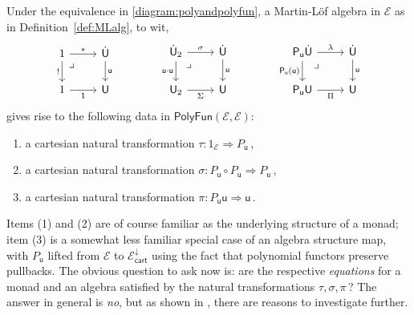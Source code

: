 \documentclass[12pt,reqno]{amsart}
\newcommand{\EE}{\ensuremath{\mathcal{E}}}
\newcommand{\alg}[1]{\ensuremath{\mathsf{#1}}}
\renewcommand{\t}{\ensuremath{\mathsf{u}}}
\newcommand{\T}{\ensuremath{\mathsf{U}}}
\newcommand{\TT}{\ensuremath{\dot{\mathsf{U}}}}
\newcommand{\pbcorner}{\arrow[dr,phantom,"\lrcorner" very near start, shift right=.5ex]} %
\theoremstyle{remark}
\theoremstyle{definition}
\begin{document}
Under the equivalence in \eqref{diagram:polyandpolyfun}, a Martin-L\"of algebra in $\EE$ as in Definition~\ref{def:MLalg}, to wit,
\begin{equation}\label{diag:MLalg2}
\begin{tikzcd}
	1 \ar[r,"*"] \ar[d,swap,"!"] \pbcorner &  \TT \ar[d, "\t"]\\  
	1 \ar[r, swap,"\mathsf{1}"] & \T
 \end{tikzcd}\qquad \qquad 
 \begin{tikzcd}
	\TT_2  \ar[r,"\sigma"] \ar[d,swap,"\t\cdot\t"] \pbcorner &  \TT \ar[d, "\t"]\\  
	\T_2 \ar[r,swap, "\Sigma"] & \T
\end{tikzcd} \qquad \qquad 
	 \begin{tikzcd}
	\alg{P}_\t\TT \ar[r,"\lambda"] \ar[d,swap,"\alg{P}_\t(\t)"] \pbcorner &  \TT \ar[d, "\t"]\\  
	\alg{P}_\t\T \ar[r,swap, "\Pi"] & \T
 \end{tikzcd} 
 \end{equation}
gives rise to the following data in $\mathsf{PolyFun}(\EE, \EE)$:
\begin{enumerate}
\item a cartesian natural transformation $\tau :1_\EE \Rightarrow P_\t$\,,
\item a cartesian natural transformation $\sigma :P_\t\circ P_\t \Rightarrow P_\t$\,,
\item a cartesian natural transformation $\pi:P_\t\t \Rightarrow \t$\,.
\end{enumerate}
%
Items (1) and (2) are of course familiar as the underlying structure of a monad; item (3) is a somewhat less familiar special case of an algebra structure map, with $P_\t$ lifted from $\EE$ to $\EE^{\downarrow}_{\mathsf{cart}}$ using the fact that polynomial functors preserve pullbacks.  The obvious question to ask now is: are the respective \emph{equations} for a monad and an algebra satisfied by the natural transformations $\tau, \sigma, \pi$\,?  The answer in general is \emph{no}, but as shown in \cite{Newstead:thesis, NA:2018}, there are reasons to investigate further.
 
\end{document}

